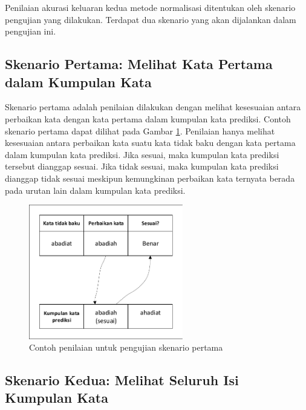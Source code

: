 Penilaian akurasi keluaran kedua metode normalisasi ditentukan oleh skenario pengujian yang dilakukan. Terdapat dua skenario yang akan dijalankan dalam pengujian ini.

\subsection{Skenario Pertama: Melihat Kata Pertama dalam Kumpulan Kata}

Skenario pertama adalah penilaian dilakukan dengan melihat kesesuaian antara perbaikan kata dengan kata pertama dalam kumpulan kata prediksi. Contoh skenario pertama dapat dilihat pada Gambar \ref{fig:skenario1_eg}. Penilaian hanya melihat kesesuaian antara perbaikan kata suatu kata tidak baku dengan kata pertama dalam kumpulan kata prediksi. Jika sesuai, maka kumpulan kata prediksi tersebut dianggap sesuai. Jika tidak sesuai, maka kumpulan kata prediksi dianggap tidak sesuai meskipun kemungkinan perbaikan kata ternyata berada pada urutan lain dalam kumpulan kata prediksi.
\begin{figure}[ht]
	\centering
	\includegraphics[width=0.6\textwidth, trim=2 2 2 2, clip]{resources/4/skenario1_eg.pdf}
	\caption{Contoh penilaian untuk pengujian skenario pertama}
	\label{fig:skenario1_eg}
\end{figure}

\subsection{Skenario Kedua: Melihat Seluruh Isi Kumpulan Kata}


